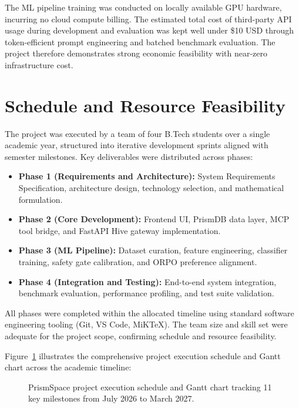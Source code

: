 \documentclass[12pt,a4paper]{report}
\begin{document}
The ML pipeline training was conducted on locally available GPU hardware, incurring no cloud compute billing. The estimated total cost of third-party API usage during development and evaluation was kept well under \$10 USD through token-efficient prompt engineering and batched benchmark evaluation. The project therefore demonstrates strong economic feasibility with near-zero infrastructure cost.

\section{Schedule and Resource Feasibility}
The project was executed by a team of four B.Tech students over a single academic year, structured into iterative development sprints aligned with semester milestones. Key deliverables were distributed across phases:

\begin{itemize}\setlength{\itemsep}{2pt}\setlength{\parskip}{0pt}
    \item \textbf{Phase 1 (Requirements and Architecture):} System Requirements Specification, architecture design, technology selection, and mathematical formulation.
    \item \textbf{Phase 2 (Core Development):} Frontend UI, PrismDB data layer, MCP tool bridge, and FastAPI Hive gateway implementation.
    \item \textbf{Phase 3 (ML Pipeline):} Dataset curation, feature engineering, classifier training, safety gate calibration, and ORPO preference alignment.
    \item \textbf{Phase 4 (Integration and Testing):} End-to-end system integration, benchmark evaluation, performance profiling, and test suite validation.
\end{itemize}

All phases were completed within the allocated timeline using standard software engineering tooling (Git, VS Code, MiKTeX). The team size and skill set were adequate for the project scope, confirming schedule and resource feasibility.

Figure~\ref{fig:project_gantt} illustrates the comprehensive project execution schedule and Gantt chart across the academic timeline:

\begin{figure}[H]
    \centering
    \caption{PrismSpace project execution schedule and Gantt chart tracking 11 key milestones from July 2026 to March 2027.}
    \label{fig:project_gantt}
\end{figure}
\end{document}
